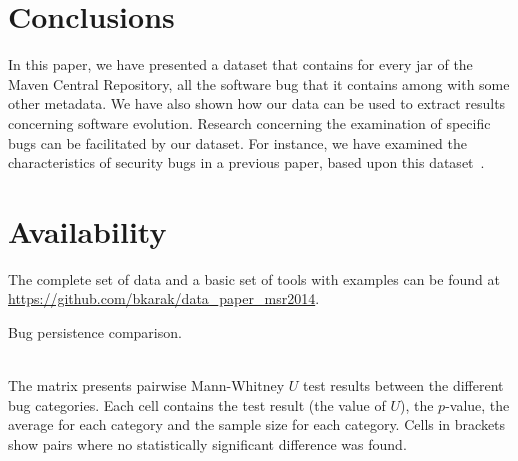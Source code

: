 \documentclass{sig-alternate}
\begin{document}
\section{Conclusions}
\label{sec:conc}

In this paper, we have presented a dataset that contains
for every {\sc jar} of the Maven Central Repository,
all the software bug that it contains among with some
other metadata. We have also shown how our data can be
used to extract results concerning software evolution.
Research concerning the examination of specific bugs
can be facilitated by our dataset. For instance,
we have examined the characteristics of security
bugs in a previous paper, based upon this dataset~\cite{MKLGS13}.


\section*{Availability}
\label{sec:availability}

The complete set of data and a basic set of tools with examples can be found at \url{https://github.com/bkarak/data_paper_msr2014}.


  

\begin{landscape}
  \begin{table}
    \setlength{\extrarowheight}{0.10cm}
    \caption{Bug persistence comparison.}
    \label{tbl:bug_persistence}
    \resizebox{0.95\columnwidth}{!}{
    }\\
    The matrix presents pairwise Mann-Whitney $U$ test results
    between the different bug categories. Each cell contains the test
    result (the value of $U$), the $p$-value, the average for each
    category and the sample size for each category. Cells in brackets show
    pairs where no statistically significant difference was found.
  \end{table}
\end{landscape}
\end{document}
